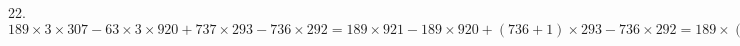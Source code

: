 22.$189\times3\times307-63\times3\times920+737\times293-736\times292=189\times921-189\times920+(736+1)\times293-736\times292=189\times(921-920)+736\times293+1\times293-
736\times292=189\times1+293+736\times(293-292)=189+293+736=1218.$\\
